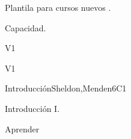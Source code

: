 
\begin{syllabus}


\begin{justification}
Plantila para cursos nuevos .
\end{justification}

\begin{goals}
\item Capacidad.
\end{goals}

\begin{outcomes}{V1}
   \item {}
\end{outcomes}

\begin{competences}{V1}
    \item {} 
\end{competences}


\begin{unit}{Introducción}{}{Sheldon,Menden}{6}{C1}
\begin{topics}
      \item Introducción I.
   \end{topics}

   \begin{learningoutcomes}
      \item Aprender
   \end{learningoutcomes}
\end{unit}






\begin{coursebibliography}
\end{coursebibliography}

\end{syllabus}
